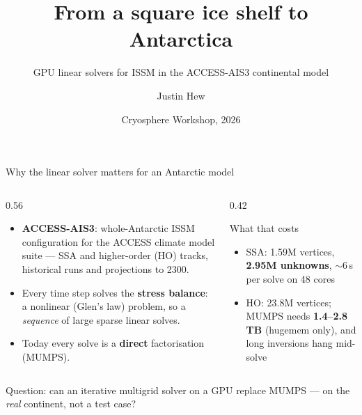 \documentclass[10pt,aspectratio=169]{beamer}
\title[GPU solvers for AIS3]{From a square ice shelf to Antarctica}
\subtitle{GPU linear solvers for ISSM in the ACCESS-AIS3 continental model}
\author[J.\ Hew]{Justin Hew}
\institute[ACCESS-NRI]{ACCESS-NRI}
\date{Cryosphere Workshop, 2026}
\newcommand{\bad}[1]{\textcolor{red!70!black}{\textbf{#1}}}
\begin{document}
\begin{frame}[plain]\titlepage\end{frame}

\begin{frame}{Why the linear solver matters for an Antarctic model}
  \begin{columns}[T]
    \begin{column}{0.56\textwidth}
      \begin{itemize}
        \item \textbf{ACCESS-AIS3}: whole-Antarctic ISSM configuration for the ACCESS
              climate model suite --- SSA and higher-order (HO) tracks, historical
              runs and projections to 2300.
        \item Every time step solves the \textbf{stress balance}: a nonlinear
              (Glen's law) problem, so a \emph{sequence} of large sparse linear
              solves.
        \item Today every solve is a \textbf{direct} factorisation (MUMPS).
      \end{itemize}
    \end{column}
    \begin{column}{0.42\textwidth}
      \begin{block}{What that costs}
        \begin{itemize}
          \item SSA: 1.59M vertices, \textbf{2.95M unknowns}, $\sim$6\,s per solve
                on 48 cores
          \item HO: 23.8M vertices; MUMPS needs \bad{1.4--2.8\,TB} (hugemem only),
                and long inversions hang mid-solve
        \end{itemize}
      \end{block}
    \end{column}
  \end{columns}
  \vspace{0.6em}
  \begin{center}
    \alert{Question:} can an iterative multigrid solver on a GPU replace MUMPS ---
    on the \emph{real} continent, not a test case?
  \end{center}
\end{frame}
\end{document}
